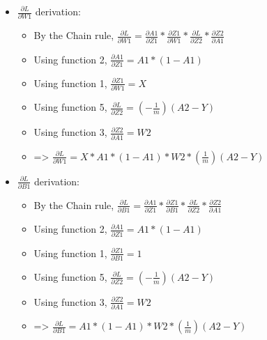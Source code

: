 \documentclass[10pt,a4paper]{article}
\begin{document}
\begin{itemize}
    \item $$ derivation:
    \begin{itemize}
        \item By the Chain rule, $ =  *  *  * $
        \item Using function 2, $ = A1 * (1-A1)$
        \item Using function 1, $ = X$
        \item Using function 5, $ = (-)(A2 - Y)$
        \item Using function 3, $ = W2$
        \item => $ = X * A1 * (1-A1) * W2 * ()(A2-Y)$
    \end{itemize}
    \item $$ derivation:
    \begin{itemize}
        \item By the Chain rule, $ =  *  *  * $
        \item Using function 2, $ = A1 * (1-A1)$
        \item Using function 1, $ = 1$
        \item Using function 5, $ = (-)(A2 - Y)$
        \item Using function 3, $ = W2$
        \item => $ = A1 * (1-A1) * W2 * ()(A2-Y)$
    \end{itemize}
\end{itemize}
\end{document}
